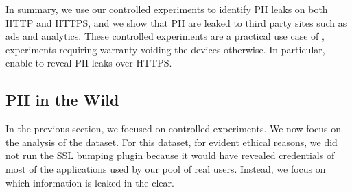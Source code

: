 In summary, we use our controlled experiments to identify PII leaks on
both HTTP and HTTPS, and we show that PII are leaked to third party
sites such as ads and analytics. These controlled experiments are a
practical use case of \platname, experiments requiring warranty
voiding the devices otherwise. In particular, \platname{} enable to
reveal PII leaks over HTTPS.


\subsection{PII in the Wild}

In the previous section, we focused on controlled experiments. We now
focus on the analysis of the \mobWild{} dataset. For this dataset, for
evident ethical reasons, we did not run the SSL bumping plugin because
it would have revealed credentials of most of the applications used by
our pool of real users. Instead, we focus on which information is
leaked in the clear.

